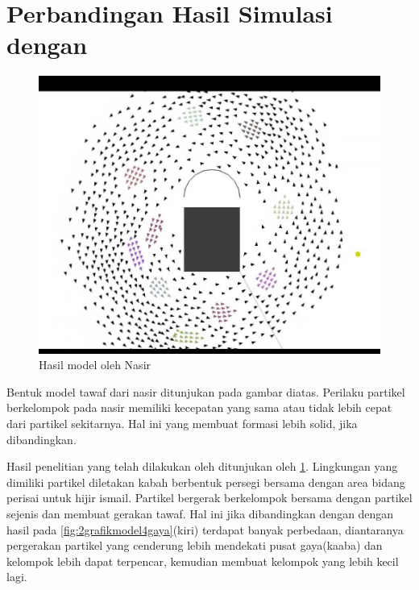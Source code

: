 \section{Perbandingan Hasil Simulasi dengan \citep{Nasir2016}}%
\begin{figure}
\centering
\includegraphics[scale=0.4]{gambar/PaperNasir.JPG}
\caption{Hasil model oleh Nasir}
\label{fig:nasir1}
\end{figure}
\hspace{0.6cm}Bentuk model tawaf dari nasir\citep{Nasir2016} ditunjukan pada gambar diatas. Perilaku partikel berkelompok pada nasir memiliki kecepatan yang sama atau tidak lebih cepat dari partikel sekitarnya. Hal ini yang membuat formasi lebih solid, jika dibandingkan.

\hspace{0.6cm} Hasil penelitian yang telah dilakukan oleh \citep{Nasir2016} ditunjukan oleh \ref{fig:nasir1}. Lingkungan yang dimiliki partikel diletakan kabah berbentuk persegi bersama dengan area bidang perisai untuk hijir ismail. Partikel bergerak berkelompok bersama dengan partikel sejenis dan membuat gerakan tawaf. Hal ini jika dibandingkan dengan dengan hasil pada \ref{fig:2grafikmodel4gaya}(kiri) terdapat banyak perbedaan, diantaranya pergerakan partikel yang cenderung lebih mendekati pusat gaya(kaaba) dan kelompok lebih dapat terpencar, kemudian membuat kelompok yang lebih kecil lagi.

